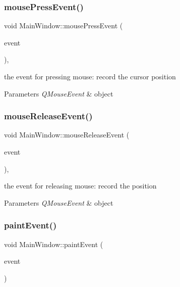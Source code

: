 \subsubsection{\texorpdfstring{mouse\+Press\+Event()}{mousePressEvent()}}
{\footnotesize\ttfamily void Main\+Window\+::mouse\+Press\+Event (\begin{DoxyParamCaption}\item[{Q\+Mouse\+Event $\ast$}]{event }\end{DoxyParamCaption})\hspace{0.3cm}{\ttfamily [override]}, {\ttfamily [protected]}}



the event for pressing mouse\+: record the cursor position 


\begin{DoxyParams}{Parameters}
{\em Q\+Mouse\+Event} & object \\
\hline
\end{DoxyParams}
\mbox{\label{class_main_window_ad162aaba235ea093b59f6a9bf0fc4d01}} 
\subsubsection{\texorpdfstring{mouse\+Release\+Event()}{mouseReleaseEvent()}}
{\footnotesize\ttfamily void Main\+Window\+::mouse\+Release\+Event (\begin{DoxyParamCaption}\item[{Q\+Mouse\+Event $\ast$}]{event }\end{DoxyParamCaption})\hspace{0.3cm}{\ttfamily [override]}, {\ttfamily [protected]}}



the event for releasing mouse\+: record the position 


\begin{DoxyParams}{Parameters}
{\em Q\+Mouse\+Event} & object \\
\hline
\end{DoxyParams}
\mbox{\label{class_main_window_abf05d580e91f725777cdb6a5eb0bf08c}} 
\subsubsection{\texorpdfstring{paint\+Event()}{paintEvent()}}
{\footnotesize\ttfamily void Main\+Window\+::paint\+Event (\begin{DoxyParamCaption}\item[{Q\+Paint\+Event $\ast$}]{event }\end{DoxyParamCaption})\hspace{0.3cm}{\ttfamily [protected]}}



